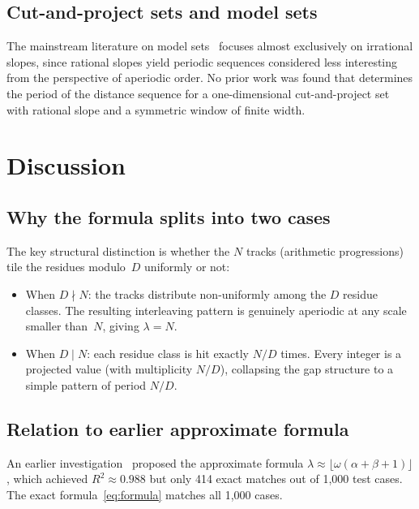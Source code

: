\documentclass[11pt]{article}
\theoremstyle{plain}
\theoremstyle{definition}
\theoremstyle{remark}
\begin{document}
\subsection{Cut-and-project sets and model sets}

The mainstream literature on model sets~\cite{Senechal2009, Meyer1972,
HaynesEtAl2016} focuses almost exclusively on irrational slopes, since
rational slopes yield periodic sequences considered less interesting from
the perspective of aperiodic order.
No prior work was found that determines the period of the distance sequence
for a one-dimensional cut-and-project set with rational slope and a
symmetric window of finite width.

\section{Discussion}\label{sec:discussion}

\subsection{Why the formula splits into two cases}

The key structural distinction is whether the $N$ tracks (arithmetic
progressions) tile the residues modulo~$D$ uniformly or not:
\begin{itemize}
    \item When $D \nmid N$: the tracks distribute non-uniformly among the
          $D$ residue classes.  The resulting interleaving pattern is
          genuinely aperiodic at any scale smaller than~$N$, giving
          $\lambda = N$.
    \item When $D \mid N$: each residue class is hit exactly $N/D$ times.
          Every integer is a projected value (with multiplicity $N/D$),
          collapsing the gap structure to a simple pattern of period $N/D$.
\end{itemize}

\subsection{Relation to earlier approximate formula}

An earlier investigation~\cite{Kunert2025} proposed the approximate formula
$\lambda \approx \lfloor\omega(\alpha+\beta+1)\rfloor$, which achieved
$R^2 \approx 0.988$ but only 414 exact matches out of 1{,}000 test cases.
The exact formula~\eqref{eq:formula} matches all 1{,}000 cases.
\end{document}
